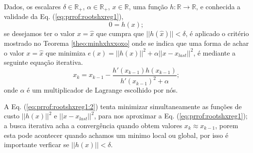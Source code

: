 \begin{myproofT}\label{proof:theo:rootshxreg}
Dados,
os escalares $\delta \in \mathbb{R}_+$,
$\alpha \in \mathbb{R}_+$, 
$x \in \mathbb{R}$, 
uma função $h:\mathbb{R} \rightarrow \mathbb{R}$, e 
conhecida a validade da Eq. (\ref{eq:prrof:rootshxreg1}),
\begin{equation}\label{eq:prrof:rootshxreg1}
0=h(x);
\end{equation}
se desejamos ter o valor $x=\hat{x}$ que cumpra que $||h(\hat{x})||<\delta$, 
é aplicado o critério mostrado no Teorema \ref{theo:minhxhxxoxo} onde se indica que uma forma de achar o valor 
$x=\hat{x}$ que minimiza $e(x)=||h(x)||^2+\alpha||x-x_{last}||^2$, é mediante a seguinte equação iterativa.  
\begin{equation}\label{eq:prrof:rootshxreg1:2}
x_{k}=x_{k-1}-\frac{h'(x_{k-1}) h(x_{k-1})}{h'(x_{k-1})^2+\alpha};
\end{equation}
onde $\alpha$ é um multiplicador de Lagrange escolhido por nós.

A Eq. (\ref{eq:prrof:rootshxreg1:2}) tenta minimizar simultaneamente 
as funções de custo $||h(x)||^2$ 
e $||x-x_{last}||^2$, para nos aproximar a Eq. (\ref{eq:prrof:rootshxreg1});
a busca iterativa acha a convergência quando obtem valores $x_{k}\approx x_{k-1}$,
porem esta pode acontecer quando achamos um minimo local ou global,
por isso é importante verficar se $||h(x)||<\delta$. 
\end{myproofT}
